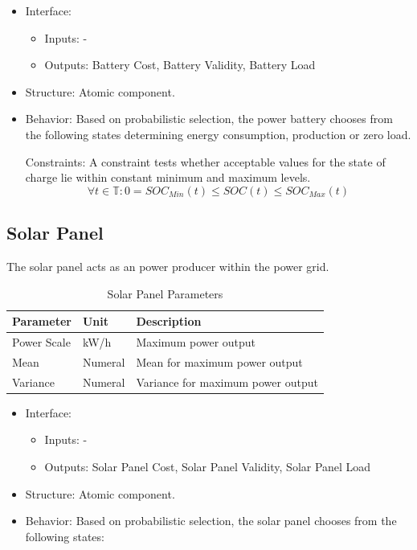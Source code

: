 \begin{itemize}
	\item Interface: 
		\begin{itemize}
			\item Inputs: -
			\item Outputs: Battery Cost, Battery Validity, Battery Load
		\end{itemize}	
	\item Structure: Atomic component.
	\item Behavior: Based on probabilistic selection, the power battery chooses from the following states determining energy consumption, production or zero load.
	
		Constraints: A constraint tests whether acceptable values for the state of charge lie within constant minimum and maximum levels.
		\[
		\forall t \in \mathbb{T} : \mathrm{0} =  SOC_{Min}(t) \leq SOC(t) \leq SOC_{Max}(t)
		\]
\end{itemize}

\subsection{Solar Panel}

The solar panel acts as an power producer within the power grid.

	 \begin{table}[h]
	 	\renewcommand{\arraystretch}{1.3}
	 	\caption{Solar Panel Parameters}
	 	\centering
	 	\begin{tabular}{lll}
	 		\hline
	 		\textbf{Parameter}                    & \textbf{Unit}    & \textbf{Description} \\ \hline
	 		Power Scale                       	  & kW/h          	 & Maximum power output \\
	 		Mean                       	  		  & Numeral          & Mean for maximum power output  \\
	 		Variance                       	      & Numeral          & Variance for maximum power output \\ \hline
	 	\end{tabular}
	 \end{table}
	 
\begin{itemize}
	\item Interface:
		\begin{itemize}
			\item Inputs: -
			\item Outputs: Solar Panel Cost, Solar Panel Validity, Solar Panel Load
		\end{itemize}	
	\item Structure: Atomic component.
	\item Behavior: Based on probabilistic selection, the solar panel chooses from the following states:
\end{itemize}

